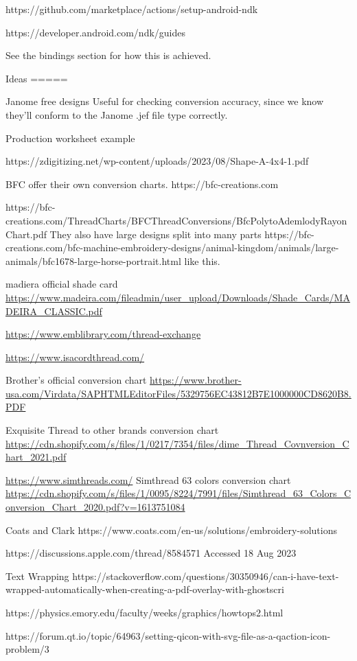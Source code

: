 \documentclass[a4paper]{report}
\begin{document}
https://github.com/marketplace/actions/setup-android-ndk

https://developer.android.com/ndk/guides

See the bindings section for how this is achieved.

Ideas
=====

Janome free designs \citep{janomeFreeDesigns}
Useful for checking conversion accuracy, since we know they'll conform to the
Janome .jef file type correctly.

Production worksheet example

https://zdigitizing.net/wp-content/uploads/2023/08/Shape-A-4x4-1.pdf

BFC offer their own conversion charts.
https://bfc-creations.com

https://bfc-creations.com/ThreadCharts/BFCThreadConversions/BfcPolytoAdemlodyRayonChart.pdf
They also have large designs split into many parts
https://bfc-creations.com/bfc-machine-embroidery-designs/animal-kingdom/animals/large-animals/bfc1678-large-horse-portrait.html
like this.

madiera official shade card
\url{https://www.madeira.com/fileadmin/user_upload/Downloads/Shade_Cards/MADEIRA_CLASSIC.pdf}

\url{https://www.emblibrary.com/thread-exchange}

\url{https://www.isacordthread.com/}

Brother's official conversion chart
\url{https://www.brother-usa.com/Virdata/SAPHTMLEditorFiles/5329756EC43812B7E1000000CD8620B8.PDF}

Exquisite Thread to other brands conversion chart
\url{https://cdn.shopify.com/s/files/1/0217/7354/files/dime_Thread_Covnversion_Chart_2021.pdf}

\url{https://www.simthreads.com/}
Simthread 63 colors conversion chart
\url{https://cdn.shopify.com/s/files/1/0095/8224/7991/files/Simthread_63_Colors_Conversion_Chart_2020.pdf?v=1613751084}

Coats and Clark https://www.coats.com/en-us/solutions/embroidery-solutions

https://discussions.apple.com/thread/8584571 Accessed 18 Aug 2023

Text Wrapping
https://stackoverflow.com/questions/30350946/can-i-have-text-wrapped-automatically-when-creating-a-pdf-overlay-with-ghostscri

https://physics.emory.edu/faculty/weeks/graphics/howtops2.html

https://forum.qt.io/topic/64963/setting-qicon-with-svg-file-as-a-qaction-icon-problem/3
\end{document}
